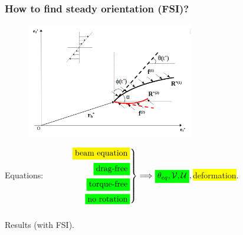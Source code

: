 \documentclass{beamer}
\begin{document}
\begin{frame}
	\frametitle{How to find steady orientation (FSI)?}
	\begin{overlayarea}{\textwidth}{\textheight}
		\vspace{-0.6cm}	
			\begin{figure}[htb]
			\begin{center}
				\includegraphics[width=0.65\textwidth]{plots/schematic/traction_on_particle.png}
			\end{center}
		\end{figure}	
      Equations: 
		$\quad \quad\quad
	\left.	\begin{aligned}
			\colorbox{yellow}{\text{beam equation}}\\
			\colorbox{green}{\text{drag-free}}\\
			\colorbox{green}{\text{torque-free}}\\
			\colorbox{green}{\text{no rotation}}
		\end{aligned}\right\}\Longrightarrow \colorbox{green}{$\theta_{eq}, \mathcal{V}, \mathcal{U}$},$\colorbox{yellow}{deformation}.	
	\end{overlayarea}
\end{frame}


\begin{frame}
	\frametitle{\mbox{}}
	\begin{overlayarea}{\textwidth}{\textheight}
		\vspace{2.5cm}	
	\Huge \centering Results (with FSI).
	\end{overlayarea}
\end{frame}

\end{document}

